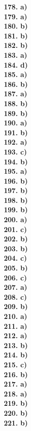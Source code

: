 \documentclass[8pt]{extarticle}
\begin{document}
\begin{multicols}{8}
\textbf{178. a)} \\
\textbf{179. a)} \\
\textbf{180. b)} \\
\textbf{181. b)} \\
\textbf{182. b)} \\
\textbf{183. a)} \\
\textbf{184. d)} \\
\textbf{185. a)} \\
\textbf{186. b)} \\
\textbf{187. a)} \\
\textbf{188. b)} \\
\textbf{189. b)} \\
\textbf{190. a)} \\
\textbf{191. b)} \\
\textbf{192. a)} \\
\textbf{193. c)} \\
\textbf{194. b)} \\
\textbf{195. a)} \\
\textbf{196. b)} \\
\textbf{197. b)} \\
\textbf{198. b)} \\
\textbf{199. b)} \\
\textbf{200. a)} \\
\textbf{201. c)} \\
\textbf{202. b)} \\
\textbf{203. b)} \\
\textbf{204. c)} \\
\textbf{205. b)} \\
\textbf{206. c)} \\
\textbf{207. a)} \\
\textbf{208. c)} \\
\textbf{209. b)} \\
\textbf{210. a)} \\
\textbf{211. a)} \\
\textbf{212. a)} \\
\textbf{213. b)} \\
\textbf{214. b)} \\
\textbf{215. c)} \\
\textbf{216. b)} \\
\textbf{217. a)} \\
\textbf{218. a)} \\
\textbf{219. b)} \\
\textbf{220. b)} \\
\textbf{221. b)} \\

\end{multicols}
\end{document}
